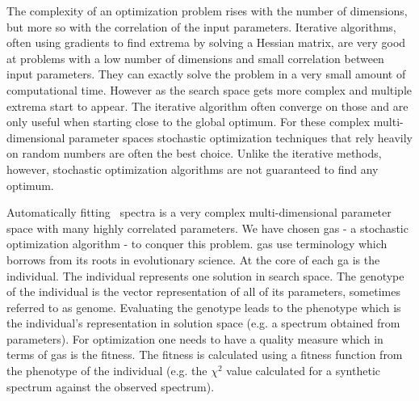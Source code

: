 The complexity of an optimization problem rises with the number of dimensions, but more so with the correlation of the input parameters. Iterative algorithms, often using gradients to find extrema by solving a Hessian matrix, are very good at problems with a low number of dimensions and small correlation between input parameters. They can exactly solve the problem in a very small amount of computational time. However as the search space gets more complex and multiple extrema start to appear. The iterative algorithm often converge on those and are only useful when starting close to the global optimum. For these complex multi-dimensional parameter spaces stochastic optimization techniques that rely heavily on random numbers are often the best choice. Unlike the iterative methods, however, stochastic optimization algorithms are not guaranteed to find any optimum. 

Automatically fitting \snia\ spectra is a very complex multi-dimensional parameter space with many highly correlated parameters. We have chosen \glspl{ga} - a stochastic optimization algorithm - to conquer this problem. \glspl{ga} use terminology which borrows from its roots in evolutionary science. At the core of each \gls{ga} is the \gls{individual}. The individual represents one solution in search space. The \gls{genotype} of the individual is the vector representation of all of its parameters, sometimes referred to as \gls{genome}. Evaluating the \gls{genotype} leads to the \gls{phenotype} which is the \gls{individual}'s representation in solution space (e.g. a spectrum obtained from parameters). For optimization one needs to have a quality measure which in terms of \glspl{ga} is the \gls{fitness}. The \gls{fitness} is calculated using a \gls{fitness} function from the \gls{phenotype} of the \gls{individual} (e.g. the $\chi^2$ value calculated for a synthetic spectrum against the observed spectrum).

